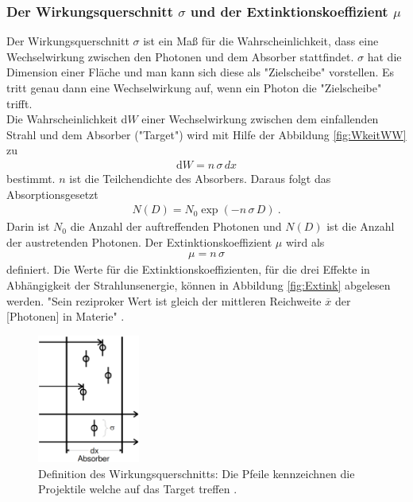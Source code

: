 \subsubsection{Der Wirkungsquerschnitt \texorpdfstring{$\sigma$}{} und der Extinktionskoeffizient \texorpdfstring{$\mu$}{}}
Der Wirkungsquerschnitt $\sigma$ ist ein Maß für die Wahrscheinlichkeit, dass eine Wechselwirkung zwischen den Photonen und dem Absorber stattfindet. $\sigma$ hat die Dimension einer Fläche und man kann sich diese als "Zielscheibe" vorstellen. Es tritt genau dann eine Wechselwirkung auf, wenn ein Photon die "Zielscheibe" trifft. \\
Die Wahrscheinlichkeit d$W$ einer Wechselwirkung zwischen dem einfallenden Strahl und dem Absorber ("Target") wird mit Hilfe der Abbildung \eqref{fig:WkeitWW} zu
\begin{align}
	\text{d}W = n\,\sigma\,dx
\end{align}
bestimmt. $n$ ist die Teilchendichte des Absorbers.
Daraus folgt das Absorptionsgesetzt
\begin{align}
	N(D) = N_0 \exp(-n\,\sigma\,D) \ .
	\label{eqn:absorption}
\end{align}
Darin ist $N_0$ die Anzahl der auftreffenden Photonen und $N(D)$ ist die Anzahl der austretenden Photonen. Der Extinktionskoeffizient $\mu$ wird als
\begin{align}
	\mu = n\,\sigma
\end{align}
definiert. Die Werte für die Extinktionskoeffizienten, für die drei Effekte in Abhängigkeit der Strahlunsenergie, können in Abbildung \eqref{fig:Extink} abgelesen werden. "Sein reziproker Wert ist gleich der mittleren Reichweite $\overline{x}$ der [Photonen] in Materie" \cite[2]{V18}.

\begin{figure}
	\centering
	\includegraphics[width=0.3\textwidth]{Bilder/WkeitWW.png}
	\caption{Definition des Wirkungsquerschnitts: Die Pfeile kennzeichnen die Projektile welche auf das Target treffen \cite{V18}.}
	\label{fig:WkeitWW}
\end{figure}

